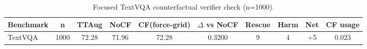 \begin{table}[t]
\centering
\begin{tabular}{lccccccccc}
\toprule
Benchmark & n & TTAug & NoCF & CF(force-grid) & $\Delta$ vs NoCF & Rescue & Harm & Net & CF usage \\
\midrule
TextVQA & 1000 & 72.28 & 71.96 & 72.28 & 0.3200 & 9 & 4 & +5 & 0.023 \\
\bottomrule
\end{tabular}
\caption{Focused TextVQA counterfactual verifier check (n=1000).}
\label{tab:cf_textvqa_focused}
\end{table}
